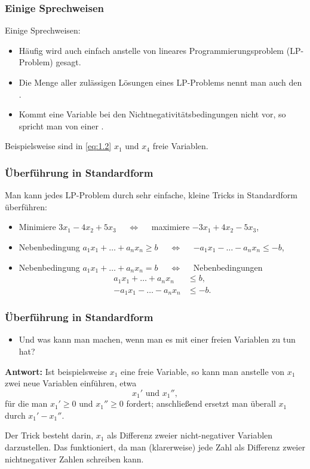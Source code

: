 \documentclass[smaller]{beamer}
\begin{document}
\begin{frame}
 \frametitle{Einige Sprechweisen}
 Einige Sprechweisen:
 \begin{itemize}
  \item Häufig wird auch einfach  anstelle von {\glqq}lineares Programmierungsproblem{\grqq} ({\glqq}LP-Problem\grqq) gesagt.
  \item Die Menge aller zulässigen Lösungen eines LP-Problems nennt man   
    auch den .
  \item Kommt eine Variable bei den Nichtnegativitätsbedingungen nicht vor, so 
    spricht man von einer . 
 \end{itemize}
 Beispielsweise sind in \eqref{eq:1.2} $x_1$ und $x_4$ freie Variablen.
\end{frame}

\begin{frame}
 \frametitle{\"Uberf\"uhrung in Standardform}
 Man kann jedes LP-Problem durch sehr einfache, \alert{kleine {\glqq}Tricks{\grqq}} in Standardform überführen:
 \begin{itemize}
 \item Minimiere $3x_1 - 4x_2 + 5x_3$ $\quad\Leftrightarrow\quad$ maximiere $- 3x_1 + 4x_2 - 5x_3$,
 \item Nebenbedingung $a_1x_1 + \ldots + a_nx_n \ge b$ $\quad\Leftrightarrow\quad$ $-a_1x_1 - \ldots - a_nx_n \le -b$, 
 \item Nebenbedingung $a_1x_1 + \ldots + a_nx_n = b$ $\quad\Leftrightarrow\quad$ Nebenbedingungen
  \begin{align*}
         a_1x_1 + \ldots + a_nx_n &\le b, \\
          -a_1x_1 - \ldots - a_nx_n &\le -b.
   \end{align*}
  \end{itemize}
\end{frame}

\begin{frame}
 \frametitle{\"Uberf\"uhrung in Standardform}
 \begin{itemize}
 \item Und was kann man machen, wenn man es mit einer freien Variablen zu 
  tun hat? 
  \end{itemize}
 \textbf{Antwort:} Ist beispielsweise $x_1$ eine freie Variable, so kann man anstelle von $x_1$ zwei neue Variablen einführen, etwa
 \begin{equation*}
      x_1' \text{ und } x_1'', 
 \end{equation*}
für die man $x_1' \ge 0$ und $x_1'' \ge 0$ fordert; anschließend ersetzt man überall $x_1$ durch $x_1' - x_1''$.

Der Trick besteht darin, $x_1$ als Differenz zweier nicht-negativer Variablen darzustellen. Das funktioniert, da man (klarerweise) jede Zahl als Differenz zweier nichtnegativer Zahlen schreiben kann.
\end{frame}
\end{document}
